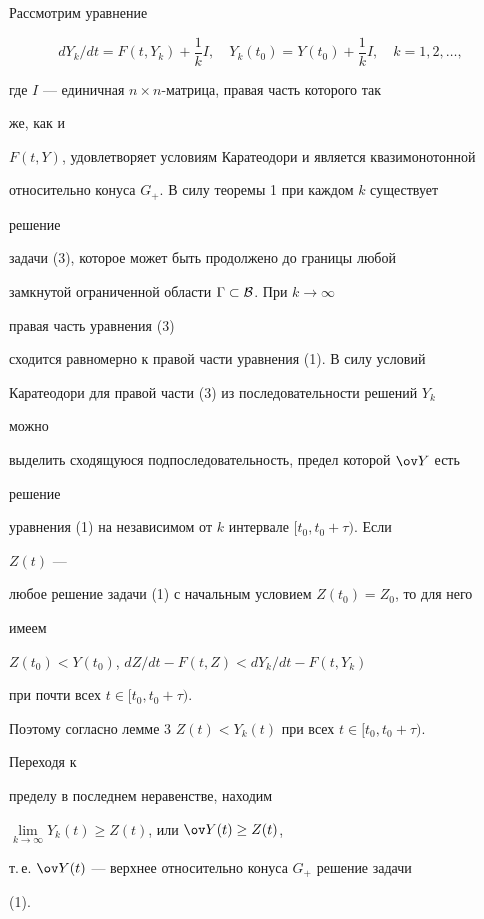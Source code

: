  


\begin{pf} 


Рассмотрим уравнение 


\begin{equation} 


d Y_k/d t=F(t,Y_k)+\frac{1}{k}I,\quad 


Y_k(t_0)=Y(t_0)+\frac{1}{k}I,\quad k=1,2,\dotsc, 


\end{equation} 


где $I$ --- единичная $n\times n$-матрица, правая часть которого так 


же, как и 


$F(t,Y)$, удовлетворяет условиям Каратеодори и является квазимонотонной 


относительно конуса $G_+$. В силу теоремы 1 при каждом $k$ существует 


решение 


задачи (3), которое может быть продолжено до границы любой 


замкнутой ограниченной области $\Gamma\subset\cal B$. При $k\to\infty$ 


правая часть уравнения (3) 


сходится равномерно к правой части уравнения (1). В силу условий 


Каратеодори для правой части (3) из последовательности решений $Y_k$ 


можно 


выделить сходящуюся подпоследовательность, предел которой $\ov Y$ есть 


решение 


уравнения (1) на независимом от $k$ интервале $[t_0,t_0+\tau)$. Если 


$Z(t)$ --- 


любое решение задачи (1) с начальным условием $Z(t_0)=Z_0$, то для него 


имеем 


$Z(t_0)<Y(t_0)$, $d Z/d t-F(t,Z)<d Y_k/d t-F(t,Y_k)$ 


при почти всех $t\in[t_0,t_0+\tau)$. 


Поэтому согласно лемме 3\; $Z(t)<Y_k(t)$ при всех $t\in[t_0,t_0+\tau)$. 


Переходя к 


пределу в последнем неравенстве, находим 


$\lim\limits_{k\to\infty}Y_k(t)\ge Z(t)$, или $\ov Y(t)\ge Z(t)$, 


т.\,е. $\ov Y(t)$ --- верхнее относительно конуса $G_+$ решение задачи 


(1). 


\end{pf} 


